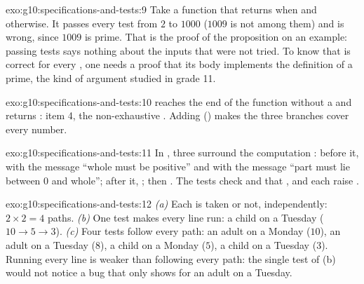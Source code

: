 \begin{solution}{exo:g10:specifications-and-tests:9}
Take a function  that returns  when  and
 otherwise. It passes every
test from $2$ to $1000$ ($1009$ is not among them) and is wrong, since $1009$ is prime. That is the proof of the
proposition on an example: passing tests says nothing about the inputs that were not tried. To know that
 is correct for every , one needs a proof that its body implements the definition of a prime,
the kind of argument studied in grade 11.
\end{solution}

\begin{solution}{exo:g10:specifications-and-tests:10}
 reaches the end of the function without a  and returns : item 4, the
non-exhaustive . Adding  () makes the three branches cover every
number.
\end{solution}

\begin{solution}{exo:g10:specifications-and-tests:11}
In , three  surround the computation
: before it,  with the message ``whole must be
positive'' and  with the message ``part must lie between 0 and whole''; after it,
; then . The tests check  and that
,  and  each raise .
\end{solution}

\begin{solution}{exo:g10:specifications-and-tests:12}
\emph{(a)} Each  is taken or not, independently: $2 \times 2 = 4$ paths. \emph{(b)} One test makes every
line run: a child on a Tuesday ($10 \to 5 \to 3$). \emph{(c)} Four tests follow every path: an adult on a Monday
($10$), an adult on a Tuesday ($8$), a child on a Monday ($5$), a child on a Tuesday ($3$). Running every line is
weaker than following every path: the single test of (b) would not notice a bug that only shows for an adult on a
Tuesday.
\end{solution}

